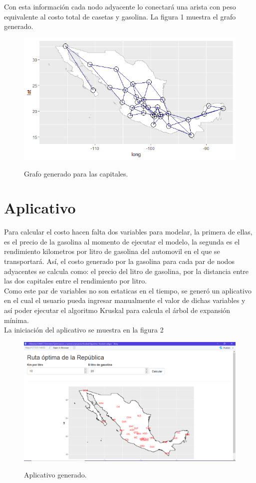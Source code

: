 \documentclass[14pt, letterpaper]{article}
\begin{document}
Con esta información cada nodo adyacente lo conectará una arista con peso equivalente al costo total de casetas y gasolina. La figura 1 muestra el grafo generado.

\begin{figure}
\centering
\includegraphics[scale=1]{i1.png} 
\label{i1}
\caption{Grafo generado para las capitales.}
\end{figure}


\section{Aplicativo}
Para calcular el costo hacen falta dos variables para modelar, la primera de ellas, es el precio de la gasolina al momento de ejecutar el modelo, la segunda es el rendimiento kilometros por litro de gasolina del automovil en el que se transportará. Así, el costo generado por la gasolina para cada par de nodos adyacentes se calcula como: el precio del litro de gasolina, por la distancia entre las dos capitales entre el rendimiento por litro.\\

Como este par de variables no son estaticas en el tiempo, se generó un aplicativo en el cual el usuario pueda ingresar manualmente el valor de dichas variables y así poder ejecutar el algoritmo Kruskal para calcula el árbol de expansión mínima.\\

La iniciación del aplicativo se muestra en la figura 2\\

\begin{figure}
\centering
\includegraphics[scale=.45]{i2.png} 
\label{i2}
\caption{Aplicativo generado.}
\end{figure}
\end{document}
